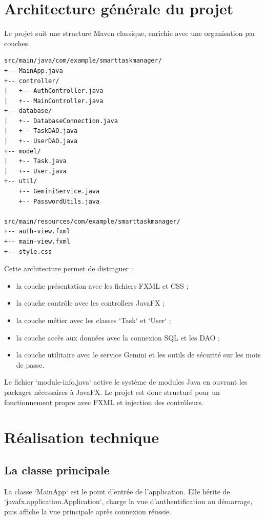 \documentclass[11pt,a4paper]{article}
\begin{document}
\section{Architecture générale du projet}

Le projet suit une structure Maven classique, enrichie avec une organisation par couches.

\begin{lstlisting}[style=javaStyle,caption={Arborescence fonctionnelle du projet}]
src/main/java/com/example/smarttaskmanager/
+-- MainApp.java
+-- controller/
|   +-- AuthController.java
|   +-- MainController.java
+-- database/
|   +-- DatabaseConnection.java
|   +-- TaskDAO.java
|   +-- UserDAO.java
+-- model/
|   +-- Task.java
|   +-- User.java
+-- util/
    +-- GeminiService.java
    +-- PasswordUtils.java

src/main/resources/com/example/smarttaskmanager/
+-- auth-view.fxml
+-- main-view.fxml
+-- style.css
\end{lstlisting}

Cette architecture permet de distinguer :
\begin{itemize}[leftmargin=1.4em]
    \item la couche présentation avec les fichiers FXML et CSS ;
    \item la couche contrôle avec les controllers JavaFX ;
    \item la couche métier avec les classes `Task` et `User` ;
    \item la couche accès aux données avec la connexion SQL et les DAO ;
    \item la couche utilitaire avec le service Gemini et les outils de sécurité sur les mots de passe.
\end{itemize}

Le fichier `module-info.java` active le système de modules Java en ouvrant les packages nécessaires à JavaFX. Le projet est donc structuré pour un fonctionnement propre avec FXML et injection des contrôleurs.

\section{Réalisation technique}

\subsection{La classe principale}

La classe `MainApp` est le point d'entrée de l'application. Elle hérite de `javafx.application.Application`, charge la vue d'authentification au démarrage, puis affiche la vue principale après connexion réussie.
\end{document}
